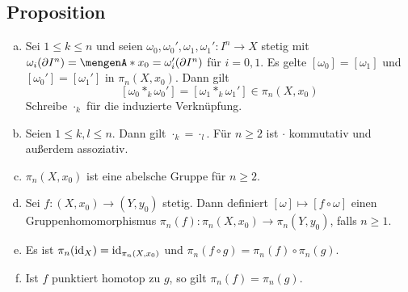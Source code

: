 \subsection[Proposition: Gruppenstruktur von $\pi_n(X,x_0)$ und induzierte Abbildungen]{Proposition} %
\label{sub:146}
\begin{enumerate}[a)]
	\item Sei $1 \le k \le n$ und seien $\omega_0, \omega_0', \omega_1, \omega_1' : I^n \to X$ stetig mit $\omega_i (\partial I^n) = \set{x_0} = \omega_i'(\partial I^n)$ 
	für $i=0,1$. Es gelte $[\omega_0] = [\omega_1]$ und $[\omega_0'] = [\omega_1']$ in $\pi_n(X,x_0)$. Dann gilt 
	\[
		[\omega_0 *_k \omega_0'] = [\omega_1 *_k \omega_1'] \in \pi_n(X, x_0)
	\]
	Schreibe $\cdot_k$ für die induzierte Verknüpfung.
	\item Seien $1 \le k,l \le n$. Dann gilt $\cdot_k = \cdot_l$. Für $n \ge 2$ ist $\cdot $ kommutativ und außerdem assoziativ.
	\item $\pi_n(X,x_0)$ ist eine abelsche Gruppe für $n \ge 2$.
	\item Sei $f : (X,x_0) \to (Y,y_0)$ stetig. Dann definiert $[\omega] \mapsto [f \circ \omega]$ einen Gruppenhomomorphismus $\pi_n(f) : \pi_n(X,x_0) \to \pi_n(Y,y_0)$,
	falls $n \ge 1$.
	\item Es ist $\pi_n(\operatorname{id}_X) = \operatorname{id}_{\pi_n(X,x_0)}$ und $\pi_n(f \circ g) = \pi_n(f) \circ \pi_n(g)$.
	\item Ist $f$ punktiert homotop zu $g$, so gilt $\pi_n(f) = \pi_n(g)$.
\end{enumerate}
